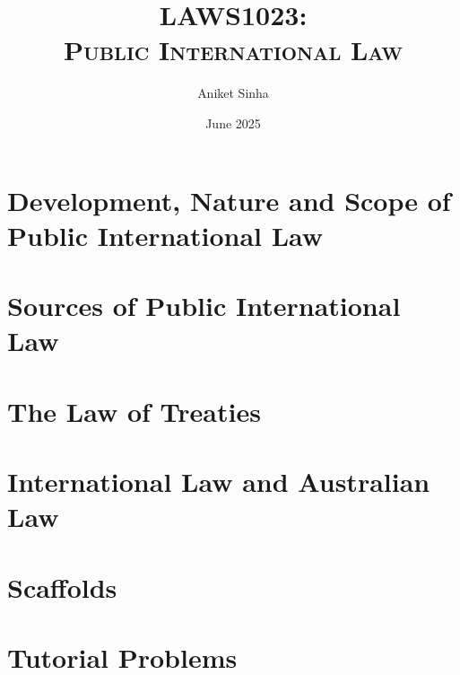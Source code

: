 \documentclass[oneside, 12pt]{book}
\title{\Huge\bfseries\scshape LAWS1023: \\ Public International Law}
\author{Aniket Sinha}
\date{June 2025}
\begin{document}
\maketitle

\frontmatter

\tableofcontents



\flushleft

\mainmatter

\chapter{Development, Nature and Scope of Public International Law}


\chapter{Sources of Public International Law}


\chapter{The Law of Treaties}


\chapter{International Law and Australian Law}


\appendix
\chapter{Scaffolds}


\chapter{Tutorial Problems}

\end{document}
